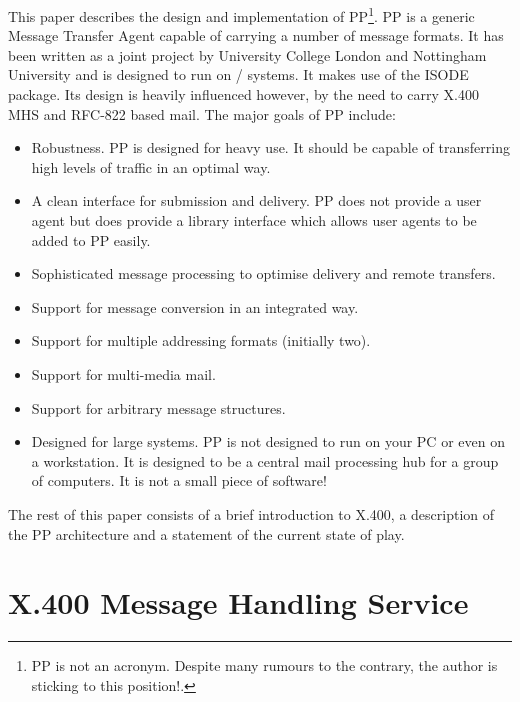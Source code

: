This paper describes the design and implementation of PP\footnote{PP
is not an acronym. Despite many rumours to the contrary, the author is
sticking to this position!.}. PP is a generic Message Transfer Agent
capable of carrying a number of message formats. It has been written
as a joint project by University College London and Nottingham
University and is designed to run on \unix/ systems. It makes
use of the ISODE package\cite{ISODE}.  Its design is heavily
influenced however, by the need to carry X.400 MHS\cite{CCITT.MHS} and
RFC-822\cite{RFC822} based mail. The major goals of PP include:
\begin{itemize}
\item	Robustness. PP is designed for heavy use. It should be
capable of transferring high levels of traffic in an optimal way.

\item	A clean interface for submission and delivery. PP does not
provide a user agent but does provide a library interface which allows
user agents to be added to PP easily.

\item	Sophisticated message processing to optimise delivery and
remote transfers.

\item	Support for message conversion in an integrated way.

\item	Support for multiple addressing formats (initially two).

\item	Support for multi-media mail.

\item	Support for arbitrary message structures.

\item	Designed for large systems. PP is not designed to run on your
PC or even on a workstation. It is designed to be a central mail
processing hub for a group of computers. It is not a small piece of
software!
\end{itemize}

The rest of this paper consists of a brief introduction to X.400, a
description of the PP architecture and a statement of the current
state of play.

\section{X.400 Message Handling Service}

